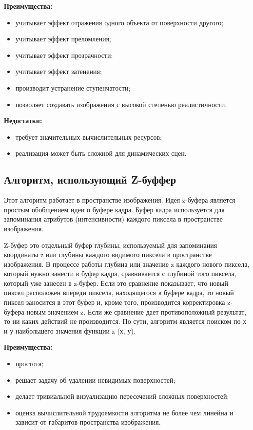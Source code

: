 \textbf{Преимущества:}
\begin{itemize}
	\item учитывает эффект отражения одного объекта от поверхности другого;
	\item учитывает эффект преломления;
	\item учитывает эффект прозрачности;
	\item учитывает эффект затенения;
	\item производит устранение ступенчатости;
	\item позволяет создавать изображения с высокой степенью реалистичности.
\end{itemize}

\textbf{Недостатки:}
\begin{itemize}
	\item требует значительных вычислительных ресурсов;
	\item реализация может быть сложной для динамических сцен.
\end{itemize} 
\subsection{Алгоритм, использующий Z-буффер}
Этот алгоритм работает в пространстве изображения. Идея z-буфера является простым обобщением идеи о буфере кадра. Буфер кадра используется для запоминания атрибутов (интенсивности) каждого пиксела в пространстве изображения. 

Z-буфер это отдельный буфер глубины, используемый для запоминания координаты z или глубины каждого видимого пиксела в пространстве изображения. В процессе работы глубина или значение z каждого нового пиксела, который нужно занести в буфер кадра, сравнивается с глубиной того пиксела, который уже занесен в z-буфер. Если это сравнение показывает, что новый пиксел расположен впереди пиксела, находящегося в буфере кадра, то новый пиксел заносится в этот буфер и, кроме того, производится корректировка z-буфера новым значением z. Если же сравнение дает противоположный результат, то ни каких действий не производится. По сути, алгоритм является поиском по х и у наибольшего значения функции z (х, у).

\textbf{Преимущества:}
\begin{itemize}
	\item простота\cite{rogers};
	\item решает задачу об удалении невидимых поверхностей;
	\item делает тривиальной визуализацию пересечений сложных поверхностей;
	\item оценка вычислительной трудоемкости алгоритма не более чем линейна и зависит от габаритов пространства изображения.
\end{itemize}

